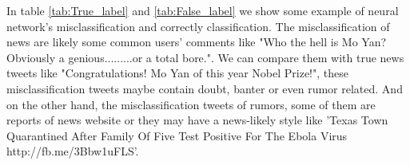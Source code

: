   
 


\begin{table}[!h]
 \centering
{}
\caption{Features Importance}
\label{tab:Features_Importance}
\end{table}

In table \ref{tab:True_label} and \ref{tab:False_label} we show some example of neural network's misclassification and  correctly classification. The misclassification of news are likely some common users' comments like "Who the hell is Mo Yan? Obviously a genious.........or a total bore.". We can compare them with true news tweets like "Congratulations! Mo Yan of this year Nobel Prize!", these misclassification tweets maybe contain doubt, banter or even rumor related. And on the other hand, the misclassification tweets of rumors, some of them are reports of news website  or they may have a news-likely style like 'Texas Town Quarantined After Family Of Five Test Positive For The Ebola Virus http://fb.me/3Bbw1uFLS'.

